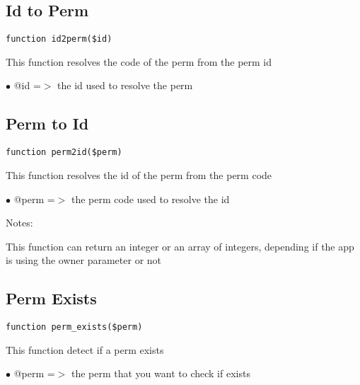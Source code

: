 \documentclass[a4paper]{book}
\begin{document}
\hypertarget{toc221}{}
\subsection{Id to Perm}

\begin{lstlisting}
function id2perm($id)
\end{lstlisting}

This function resolves the code of the perm from the perm id

\begin{compactitem}
\item[\color{myblue}$\bullet$] @id =$>$ the id used to resolve the perm
\end{compactitem}

\hypertarget{toc222}{}
\subsection{Perm to Id}

\begin{lstlisting}
function perm2id($perm)
\end{lstlisting}

This function resolves the id of the perm from the perm code

\begin{compactitem}
\item[\color{myblue}$\bullet$] @perm =$>$ the perm code used to resolve the id
\end{compactitem}

Notes:

This function can return an integer or an array of integers, depending
if the app is using the owner parameter or not

\hypertarget{toc223}{}
\subsection{Perm Exists}

\begin{lstlisting}
function perm_exists($perm)
\end{lstlisting}

This function detect if a perm exists

\begin{compactitem}
\item[\color{myblue}$\bullet$] @perm =$>$ the perm that you want to check if exists
\end{compactitem}
\end{document}
